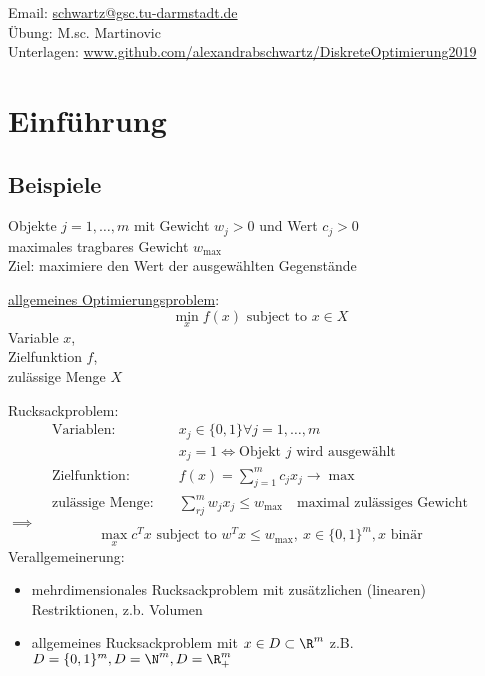 
Email: \url{schwartz@gsc.tu-darmstadt.de}\\
Übung: M.sc. Martinovic\\
Unterlagen: \url{www.github.com/alexandrabschwartz/DiskreteOptimierung2019}

\section{Einführung}
\subsection{Beispiele}
\begin{beispiel}[Rucksackproblem]\enter
	Objekte $j=1,\dots,m$ mit Gewicht $w_{j}>0$ und Wert $c_{j}>0$\\
	maximales tragbares Gewicht $w_{\max}$\\
	Ziel: maximiere den Wert der ausgewählten Gegenstände
\end{beispiel} 

\underline{allgemeines Optimierungsproblem}:
\begin{equation*}
	\min_{x} f(x) \text{ subject to } x \in X
\end{equation*} 
Variable $x$,\\ 
Zielfunktion $f$, \\
zulässige Menge $X$

Rucksackproblem: 
\begin{align*}
\text{Variablen}:\quad & x_{j} \in \{0,1\} \forall j =1, \dots, m\\
				 & x_{j}=1 \iff \text{Objekt $j$ wird ausgewählt}\\
\text{Zielfunktion}:\quad& f(x)= \sum_{j=1}^{m} c_j x_{j}\rightarrow \max\\
\text{zulässige Menge}:\quad & \sum_{rj}^{m} w_j x_j \leq w_{\max}\quad \text{maximal zulässiges Gewicht}
\end{align*} 
$\implies$ 
\begin{equation*}
	\max_{x}c^Tx \text{ subject to } w^Tx \leq w_{\max},\ x \in \{0,1\}^m, x \text{ binär}
\end{equation*}
Verallgemeinerung:
\begin{itemize}
	\item mehrdimensionales Rucksackproblem mit zusätzlichen (linearen) Restriktionen, z.b. Volumen
	\item allgemeines Rucksackproblem mit $x\in D\subset \R^m$ z.B. $D=\{0,1\}^m, D=\N^m , D = \R_{+}^m$
\end{itemize} 

